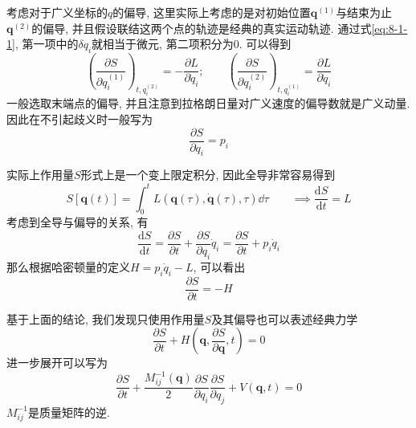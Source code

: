         考虑对于广义坐标的$q$的偏导, 这里实际上考虑的是对初始位置$\bm q^{(1)}$与结束为止$\bm q^{(2)}$的偏导, 并且假设联结这两个点的轨迹是经典的真实运动轨迹. 通过式\ref{eq:8-1-1}, 第一项中的$\delta q_i$就相当于微元, 第二项积分为0. 可以得到
        \begin{equation}
            \left( \frac{\partial S}{\partial q_i^{(1)}} \right)_{t, q_i^{(2)}} = - \frac{\partial L}{\partial \dot q_i};
            \qquad
            \left(\frac{\partial S}{\partial q_i^{(2)}}\right)_{t, q_i^{(1)}} = \frac{\partial L}{\partial \dot q_i}
        \end{equation}
        一般选取末端点的偏导, 并且注意到拉格朗日量对广义速度的偏导数就是广义动量. 因此在不引起歧义时一般写为
        \begin{equation}
            \frac{\partial S}{\partial q_i} = p_i
        \end{equation}

        实际上作用量$S$形式上是一个变上限定积分, 因此全导非常容易得到
        \begin{equation}
            S[\bm q(t)] = \int_{0}^{t} L( \bm q(\tau), \dot{\bm q}(\tau), \tau ) \dd \tau
            \qquad \implies \frac{\mathrm{d} S}{\mathrm{d} t} = L
        \end{equation}
        考虑到全导与偏导的关系, 有
        \begin{equation}
            \frac{\mathrm{d} S}{\mathrm{d} t} = \frac{\partial S}{\partial t} + \frac{\partial S}{\partial q_i} \dot{q}_i = \frac{\partial S}{\partial t} + p_i\dot{q}_i
        \end{equation}
        那么根据哈密顿量的定义$H = p_i \dot q_i - L$, 可以看出
        \begin{equation}\label{eq:8-1-2-1}
            \frac{\partial S}{\partial t} = - H
        \end{equation}

        基于上面的结论, 我们发现只使用作用量$S$及其偏导也可以表述经典力学
        \begin{equation}
            \frac{\partial S}{\partial t} + H(\bm q, \frac{\partial S}{\partial \bm q}, t) = 0
        \end{equation}
        进一步展开可以写为
        \begin{equation}\label{eq:8-1-2-2}
            \frac{\partial S}{\partial t} + \frac{M^{-1}_{ij}(\bm q)}{2} \frac{\partial S}{\partial q_i}\frac{\partial S}{\partial q_j} + V(\bm q, t) = 0
        \end{equation}
        $M^{-1}_{ij}$是质量矩阵的逆. 

